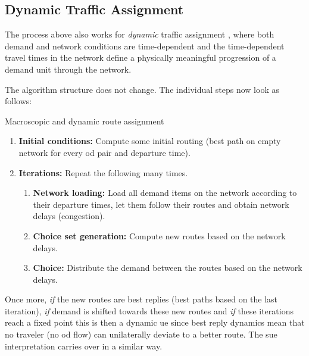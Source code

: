 \subsection{Dynamic Traffic Assignment}

The process above also works for \emph{dynamic} traffic
assignment \citep[DTA; see][]{peeta-2001}, where both demand and
network conditions are time-dependent and the time-dependent travel 
times in the network define a physically meaningful progression of 
a demand unit through the network. 

The algorithm structure does not change. The individual steps now look as follows:
\begin{algorithm}[H]
\label{dynamic-macro-routes}

\caption{Macroscopic and dynamic route assignment}

\begin{enumerate}

\item \textbf{Initial conditions:} Compute some initial routing (\eg best path on empty network
  for every \gls{od} pair and departure time).

\item \textbf{Iterations:} Repeat the following many times.

\begin{enumerate}

\item \textbf{Network loading:} Load all demand items on the network
  according to their departure times, let them follow their
  routes and obtain network delays (congestion).

\item \textbf{Choice set generation:} Compute new routes based on the
  network delays.

\item \textbf{Choice:} Distribute the demand between the routes based
  on the network delays.

\end{enumerate} %

\end{enumerate}

\end{algorithm}

Once more, \emph{if} the new routes are best replies (\ie best paths
based on the last iteration), \emph{if} demand is shifted towards
these new routes and \emph{if} these iterations reach a fixed point this is then a dynamic \gls{ue}\corr{,}{} since best reply dynamics mean
that no traveler (no \gls{od} flow) can unilaterally deviate to a better route.  The
\gls{sue} interpretation carries over in a similar way.

